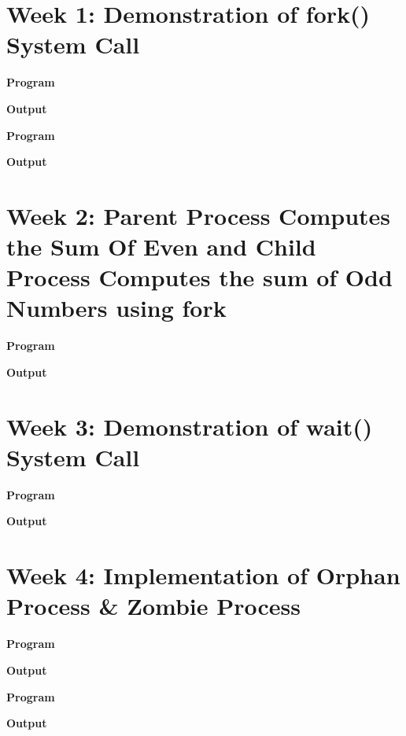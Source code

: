 \documentclass{article}
\begin{document}
\tableofcontents

\newpage

\section{Week 1: Demonstration of fork() System Call}

\noindent \textbf{\large{Program}}


\noindent \textbf{\large{Output}}


\noindent \textbf{\large{Program}}


\noindent \textbf{\large{Output}}


\newpage
\section{Week 2: Parent Process Computes the Sum Of Even and Child Process Computes the sum of Odd Numbers using fork}

\noindent \textbf{\large{Program}}


\noindent \textbf{\large{Output}}


\newpage
\section{Week 3: Demonstration of wait() System Call}

\noindent \textbf{\large{Program}}


\noindent \textbf{\large{Output}}


\newpage
\section{Week 4: Implementation of Orphan Process \& Zombie Process}

\noindent \textbf{\large{Program}}


\noindent \textbf{\large{Output}}


\noindent \textbf{\large{Program}}


\noindent \textbf{\large{Output}}

\end{document}
